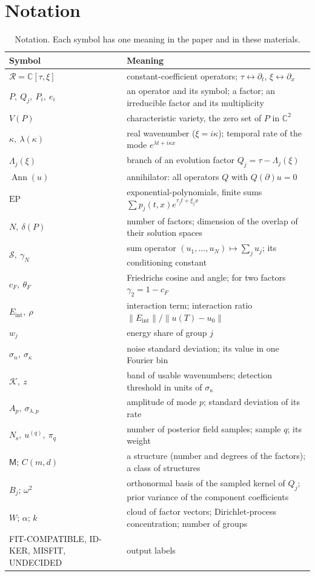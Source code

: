 \documentclass[11pt]{article}
\theoremstyle{plain}
\theoremstyle{definition}
\theoremstyle{remark}
\newcommand{\C}{\mathbb{C}}
\newcommand{\ring}{\mathcal{R}}            %
\DeclareMathOperator{\Ann}{Ann}             %
\newcommand{\Var}{V}                        %
\newcommand{\EP}{\mathrm{EP}}               %
\newcommand{\sumop}{\mathcal{S}}            %
\newcommand{\Eint}{E_{\mathrm{int}}}        %
\newcommand{\cF}{c_{F}}                     %
\newcommand{\thetaF}{\theta_{F}}            %
\newcommand{\gN}{\gamma_{N}}                %
\newcommand{\deltaP}{\delta(P)}             %
\newcommand{\noise}{\sigma_{n}}             %
\newcommand{\sigbin}{\sigma_{\kappa}}       %
\newcommand{\Nsamp}{N_{\mathrm s}}          %
\newcommand{\cloud}{W}                      %
\newcommand{\Mfit}{\mathsf{M}}              %
\newcommand{\lab}[1]{\textsf{#1}}           %
\newcommand{\FC}{\lab{FIT-COMPATIBLE}}
\newcommand{\IDK}{\lab{ID-KER}}
\newcommand{\MIS}{\lab{MISFIT}}
\newcommand{\UND}{\lab{UNDECIDED}}
\newcommand{\norm}[1]{\lVert#1\rVert}
\begin{document}
\section{Notation}\label{sm:notation}
\begin{table}[htbp]
\centering\small
\caption{Notation. Each symbol has one meaning in the paper and in these materials.}\label{sm:tab:notation}
\begin{tabularx}{\linewidth}{@{}l >{\raggedright\arraybackslash}X@{}}
\toprule
Symbol & Meaning\\
\midrule
$\ring=\C[\tau,\xi]$ & constant-coefficient operators; $\tau\leftrightarrow\partial_t$, $\xi\leftrightarrow\partial_x$\\
$P,\ Q_j,\ P_i,\ e_i$ & an operator and its symbol; a factor; an irreducible factor and its multiplicity\\
$\Var(P)$ & characteristic variety, the zero set of $P$ in $\C^2$\\
$\kappa,\ \lambda(\kappa)$ & real wavenumber ($\xi=i\kappa$); temporal rate of the mode $e^{\lambda t+i\kappa x}$\\
$\Lambda_j(\xi)$ & branch of an evolution factor $Q_j=\tau-\Lambda_j(\xi)$\\
$\Ann(u)$ & annihilator: all operators $Q$ with $Q(\partial)u=0$\\
$\EP$ & exponential-polynomials, finite sums $\sum p_j(t,x)e^{\tau_jt+\xi_jx}$\\
$N,\ \deltaP$ & number of factors; dimension of the overlap of their solution spaces\\
$\sumop,\ \gN$ & sum operator $(u_1,\dots,u_N)\mapsto\sum_ju_j$; its conditioning constant\\
$\cF,\ \thetaF$ & Friedrichs cosine and angle; for two factors $\gamma_2=1-\cF$\\
$\Eint,\ \rho$ & interaction term; interaction ratio $\norm{\Eint}/\norm{u(T)-u_0}$\\
$w_j$ & energy share of group $j$\\
$\noise,\ \sigbin$ & noise standard deviation; its value in one Fourier bin\\
$\mathcal K,\ z$ & band of usable wavenumbers; detection threshold in units of $\sigbin$\\
$A_p,\ \sigma_{\lambda,p}$ & amplitude of mode $p$; standard deviation of its rate\\
$\Nsamp,\ u^{(q)},\ \pi_q$ & number of posterior field samples; sample $q$; its weight\\
$\Mfit$; $C(m,d)$ & a structure (number and degrees of the factors); a class of structures\\
$B_j$; $\omega^2$ & orthonormal basis of the sampled kernel of $Q_j$; prior variance of the component coefficients\\
$\cloud$; $\alpha$; $k$ & cloud of factor vectors; Dirichlet-process concentration; number of groups\\
\FC, \IDK, \MIS, \UND & output labels\\
\bottomrule
\end{tabularx}
\end{table}
\end{document}
